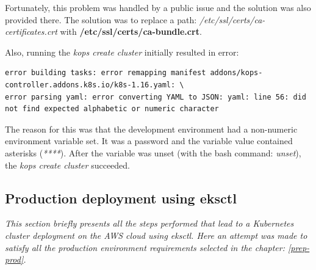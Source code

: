 Fortunately, this problem was handled by a public issue and the solution was also provided there\cite{as-github-issue}. The solution was to replace a path: \textit{/etc/ssl/certs/ca-certificates.crt} with \textbf{/etc/ssl/certs/ca-bundle.crt}.

Also, running the \textit{kops create cluster} initially resulted in error:
\begin{lstlisting}[caption={Error output of \textit{kops create cluster} command}]
error building tasks: error remapping manifest addons/kops-controller.addons.k8s.io/k8s-1.16.yaml: \
error parsing yaml: error converting YAML to JSON: yaml: line 56: did not find expected alphabetic or numeric character
\end{lstlisting}

The reason for this was that the development environment had a non-numeric environment variable set. It was a password and the variable value contained asterisks (\textit{****}). After the variable was unset (with the bash command: \textit{unset}), the \textit{kops create cluster} succeeded.


\subsection{Production deployment using eksctl}
\textit{This section briefly presents all the steps performed that lead to a Kubernetes cluster deployment on the AWS cloud using eksctl. Here an attempt was made to satisfy all the production environment requirements selected in the chapter: \ref{prep-prod}.}
\\

